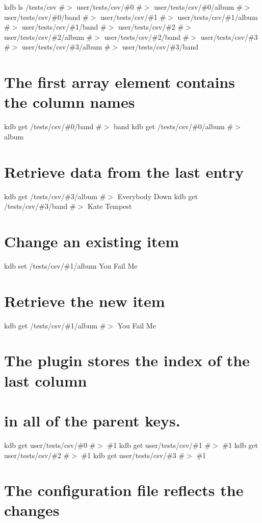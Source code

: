 kdb ls /tests/csv \#$>$ user/tests/csv/\#0 \#$>$ user/tests/csv/\#0/album \#$>$ user/tests/csv/\#0/band \#$>$ user/tests/csv/\#1 \#$>$ user/tests/csv/\#1/album \#$>$ user/tests/csv/\#1/band \#$>$ user/tests/csv/\#2 \#$>$ user/tests/csv/\#2/album \#$>$ user/tests/csv/\#2/band \#$>$ user/tests/csv/\#3 \#$>$ user/tests/csv/\#3/album \#$>$ user/tests/csv/\#3/band

\section*{The first array element contains the column names}

kdb get /tests/csv/\#0/band \#$>$ band kdb get /tests/csv/\#0/album \#$>$ album

\section*{Retrieve data from the last entry}

kdb get /tests/csv/\#3/album \#$>$ Everybody Down kdb get /tests/csv/\#3/band \#$>$ Kate Tempest

\section*{Change an existing item}

kdb set /tests/csv/\#1/album \textquotesingle{}You Fail Me\textquotesingle{} \section*{Retrieve the new item}

kdb get /tests/csv/\#1/album \#$>$ You Fail Me

\section*{The plugin stores the index of the last column}

\section*{in all of the parent keys.}

kdb get user/tests/csv/\#0 \#$>$ \#1 kdb get user/tests/csv/\#1 \#$>$ \#1 kdb get user/tests/csv/\#2 \#$>$ \#1 kdb get user/tests/csv/\#3 \#$>$ \#1

\section*{The configuration file reflects the changes}

